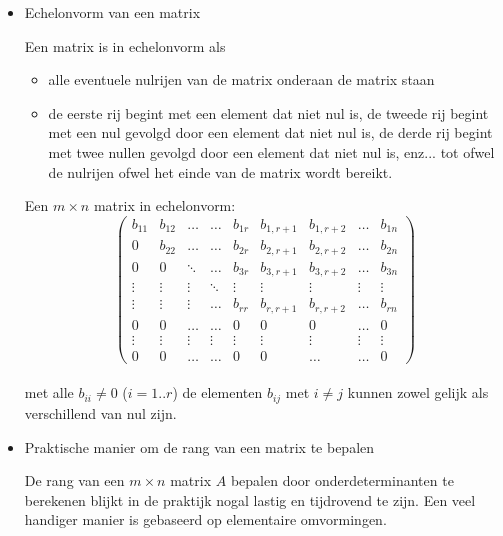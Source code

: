 \begin{itemize}

\item{Echelonvorm van een matrix}

Een matrix is in echelonvorm als
\begin{itemize}
	\item alle eventuele nulrijen van de matrix onderaan de matrix staan
	\item de eerste rij begint met een element dat niet nul is, de tweede rij begint met een nul gevolgd door een element dat niet nul is, de derde rij begint met twee nullen gevolgd door een element dat niet nul is, enz... tot ofwel de nulrijen ofwel het einde van de matrix wordt bereikt.
\end{itemize}

Een $m \times n$ matrix in echelonvorm:\\

\[ \left( \begin{matrix}
b_{11} & b_{12} & \ldots & \ldots & b_{1r} & b_{1,r+1} & b_{1,r+2} & \ldots & b_{1n} \\
0 & b_{22} & \ldots & \ldots & b_{2r} & b_{2,r+1} & b_{2,r+2} & \ldots & b_{2n} \\
0 & 0 & \ddots & \ldots & b_{3r} & b_{3,r+1} & b_{3,r+2} & \ldots & b_{3n} \\
\vdots & \vdots & \vdots & \ddots & \vdots & \vdots & \vdots & \vdots & \vdots \\
\vdots & \vdots & \vdots & \ldots & b_{rr} & b_{r,r+1} & b_{r,r+2} & \ldots & b_{rn} \\
0 & 0 & \ldots & \ldots & 0 & 0 & 0 & \ldots & 0\\
\vdots & \vdots & \vdots & \vdots & \vdots & \vdots & \vdots & \vdots & \vdots \\
0 & 0 & \ldots & \ldots & 0 & 0 & \ldots & \ldots & 0
\end{matrix} \right)  \] \\

met alle $b_{ii} \neq 0$ ($i=1..r$) de elementen $b_{ij}$ met $i \neq j$ kunnen zowel gelijk als verschillend van nul zijn.\\


\item{Praktische manier om de rang van een matrix te bepalen}

De rang van een $m \times n$ matrix $A$ bepalen door onderdeterminanten te berekenen blijkt in de praktijk nogal lastig en tijdrovend te zijn. Een veel handiger manier is gebaseerd op elementaire omvormingen.\\


\end{itemize}
